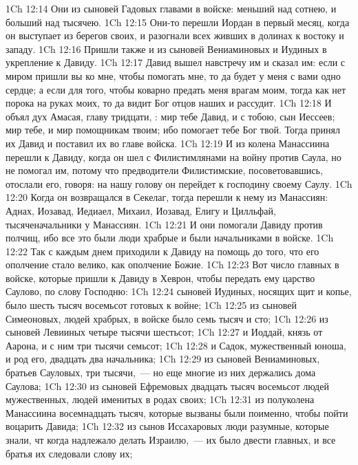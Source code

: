 \vs 1Ch 12:14 Они из сыновей Гадовых  главами в войске: меньший над сотнею, и больший над тысячею.
\vs 1Ch 12:15 Они-то перешли Иордан в первый месяц, когда он выступает из берегов своих, и разогнали всех живших в долинах к востоку и западу.
\rsbpar\vs 1Ch 12:16 Пришли также и из сыновей Вениаминовых и Иудиных в укрепление к Давиду.
\vs 1Ch 12:17 Давид вышел навстречу им и сказал им: если с миром пришли вы ко мне, чтобы помогать мне, то да будет у меня с вами одно сердце; а если для того, чтобы коварно предать меня врагам моим, тогда как нет порока на руках моих, то да видит Бог отцов наших и рассудит.
\vs 1Ch 12:18 И объял дух Амасая, главу тридцати, : мир тебе Давид, и с тобою, сын Иессеев; мир тебе, и мир помощникам твоим; ибо помогает тебе Бог твой. Тогда принял их Давид и поставил их во главе войска.
\rsbpar\vs 1Ch 12:19 И из колена Манассиина перешли  к Давиду, когда он шел с Филистимлянами на войну против Саула, но не помогал им, потому что предводители Филистимские, посоветовавшись, отослали его, говоря: на нашу голову он перейдет к господину своему Саулу.
\vs 1Ch 12:20 Когда он возвращался в Секелаг, тогда перешли к нему из Манассиян: Аднах, Иозавад, Иедиаел, Михаил, Иозавад, Елигу и Цилльфай, тысяченачальники у Манассиян.
\vs 1Ch 12:21 И они помогали Давиду против полчищ, ибо все это были люди храбрые и были начальниками в войске.
\vs 1Ch 12:22 Так с каждым днем приходили к Давиду на помощь до того, что его ополчение стало велико, как ополчение Божие.
\rsbpar\vs 1Ch 12:23 Вот число главных в войске, которые пришли к Давиду в Хеврон, чтобы передать ему царство Саулово, по слову Господню:
\vs 1Ch 12:24 сыновей Иудиных, носящих щит и копье, было шесть тысяч восемьсот готовых к войне;
\vs 1Ch 12:25 из сыновей Симеоновых, людей храбрых, в войске было семь тысяч и сто;
\vs 1Ch 12:26 из сыновей Левииных четыре тысячи шестьсот;
\vs 1Ch 12:27 и Иоддай, князь от  Аарона, и с ним три тысячи семьсот;
\vs 1Ch 12:28 и Садок, мужественный юноша, и род его, двадцать два начальника;
\vs 1Ch 12:29 из сыновей Вениаминовых, братьев Сауловых, три тысячи,~--- но еще многие из них держались дома Саулова;
\vs 1Ch 12:30 из сыновей Ефремовых двадцать тысяч восемьсот людей мужественных, людей именитых в родах своих;
\vs 1Ch 12:31 из полуколена Манассиина восемнадцать тысяч, которые вызваны были поименно, чтобы пойти воцарить Давида;
\vs 1Ch 12:32 из сынов Иссахаровых  люди разумные, которые знали, чт когда надлежало делать Израилю,~--- их было двести главных, и все братья их следовали слову их;
